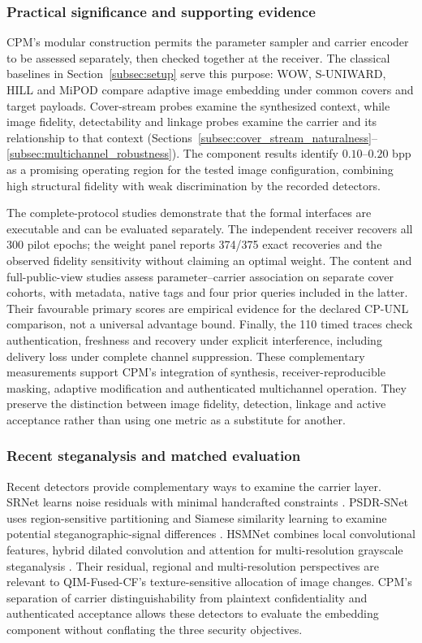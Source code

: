 \documentclass[pdflatex,sn-mathphys-num]{sn-jnl}%
\theoremstyle{definition}
\theoremstyle{game}
\theoremstyle{thmstyleone}%
\theoremstyle{thmstyletwo}%
\theoremstyle{thmstylethree}%
\begin{document}
\subsubsection{Practical significance and supporting evidence}
CPM's modular construction permits the parameter sampler and carrier
encoder to be assessed separately, then checked together at the receiver.
The classical baselines in Section~\ref{subsec:setup} serve this purpose:
WOW, S-UNIWARD, HILL and MiPOD compare adaptive image embedding under common
covers and target payloads. Cover-stream probes examine the synthesized
context, while image fidelity, detectability and linkage probes examine
the carrier and its relationship to that context
(Sections~\ref{subsec:cover_stream_naturalness}--\ref{subsec:multichannel_robustness}).
The component results identify $0.10$--$0.20$ bpp as a promising
operating region for the tested image configuration, combining high
structural fidelity with weak discrimination by the recorded detectors.

The complete-protocol studies demonstrate that the formal interfaces are executable
and can be evaluated separately. The independent receiver recovers all
300 pilot epochs; the weight panel reports 374/375 exact recoveries and
the observed fidelity sensitivity without claiming an optimal weight.
The content and full-public-view studies assess parameter--carrier
association on separate cover cohorts, with metadata, native tags and
four prior queries included in the latter. Their favourable primary
scores are empirical evidence for the declared CP-UNL comparison, not
a universal advantage bound. Finally, the 110 timed traces check
authentication, freshness and recovery under explicit interference,
including delivery loss under complete channel suppression.
These complementary measurements support CPM's integration of synthesis,
receiver-reproducible masking, adaptive modification and authenticated
multichannel operation. They preserve the distinction between image
fidelity, detection, linkage and active acceptance rather than using
one metric as a substitute for another.

\subsubsection{Recent steganalysis and matched evaluation}
Recent detectors provide complementary ways to examine the carrier layer.
SRNet learns noise residuals with minimal handcrafted constraints
\cite{Boroumand2019SRNet}. PSDR-SNet uses region-sensitive partitioning and
Siamese similarity learning to examine potential steganographic-signal
differences \cite{Su2025PSDRSNet}. HSMNet combines local convolutional
features, hybrid dilated convolution and attention for multi-resolution
grayscale steganalysis \cite{Yang2026HSMNet}. Their residual, regional and
multi-resolution perspectives are relevant to QIM-Fused-CF's
texture-sensitive allocation of image changes. CPM's separation of
carrier distinguishability from plaintext confidentiality and
authenticated acceptance allows these detectors to evaluate the embedding
component without conflating the three security objectives.
\end{document}
